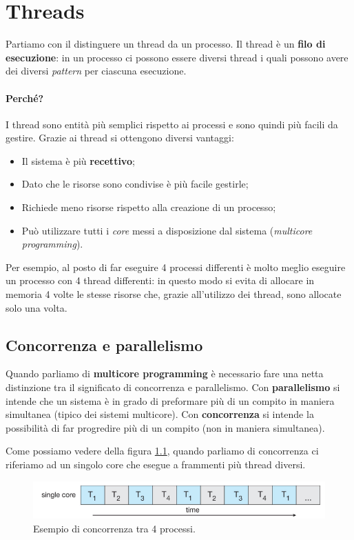 \chapter{Threads}
Partiamo con il distinguere un thread da un processo. Il thread è un \textbf{filo di esecuzione}: in un processo ci possono essere diversi thread i quali possono avere dei diversi \textit{pattern} per ciascuna esecuzione.

\subsubsection*{Perché?}
I thread sono entità più semplici rispetto ai processi e sono quindi più facili da gestire. Grazie ai thread si ottengono diversi vantaggi:
\vspace{-5px}
\begin{itemize}
\setlength{\itemsep}{-.25 em}
    \item Il sistema è più \textbf{recettivo};
    \item Dato che le risorse sono condivise è più facile gestirle;
    \item Richiede meno risorse rispetto alla creazione di un processo;
    \item Può utilizzare tutti i \textit{core} messi a disposizione dal sistema (\textit{multicore programming}).
\end{itemize}

\noindent Per esempio, al posto di far eseguire 4 processi differenti è molto meglio eseguire un processo con 4 thread differenti: in questo modo si evita di allocare in memoria 4 volte le stesse risorse che, grazie all'utilizzo dei thread, sono allocate solo una volta. 
% 
\section{Concorrenza e parallelismo} \label{parallelismo}
Quando parliamo di \textbf{multicore programming} è necessario fare una netta distinzione tra il significato di concorrenza e parallelismo. Con \textbf{parallelismo} si intende che un sistema è in grado di preformare più di un compito in maniera simultanea (tipico dei sistemi multicore). Con \textbf{concorrenza} si intende la possibilità di far progredire più di un compito (non in maniera simultanea).

Come possiamo vedere della figura \ref{fig:concorrenza}, quando parliamo di concorrenza ci riferiamo ad un singolo core che esegue a frammenti più thread diversi.
\begin{figure}[!h]
    \centering
    \includegraphics[width=.7\textwidth]{../res/imgs/threads/concorrenza.png}
    \caption{Esempio di concorrenza tra 4 processi.}
    \label{fig:concorrenza}
\end{figure}

